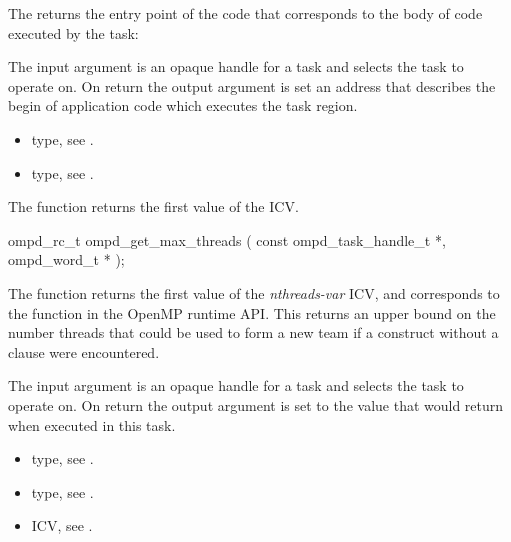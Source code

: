 \descr
The  returns the entry point of the code
that corresponds to the body of code executed by the task:

\argdesc
The input argument  is an opaque handle for a task and selects the task to operate on.
On return the output argument  is set an address that describes the begin of application
code which executes the task region.

\crossreferences
\begin{itemize}
	\item {} type, see .
	\item {} type, see .
\end{itemize}


\label{ompd:ompd_get_max_threads}
\summary
The  function returns the first value of the  ICV.

\format
\begin{cspecific}
\begin{ompSyntax}
ompd_rc_t ompd_get_max_threads (
  const ompd_task_handle_t *,
  ompd_word_t *
);
\end{ompSyntax}
\end{cspecific}

\descr
The  function returns the first value of the
 \emph{nthreads-var} ICV,
and corresponds to the  function
in the OpenMP runtime API.
This returns an upper bound on the number threads that could be used
to form a new team if a  construct without a
 clause were encountered.

\argdesc
The input argument  is an opaque handle for a task and selects the task to operate on.
On return the output argument  is set to the value that  would return when
executed in this task.

\crossreferences
\begin{itemize}
	\item {} type, see .
	\item {} type, see .
	\item {} ICV, see .
\end{itemize}

